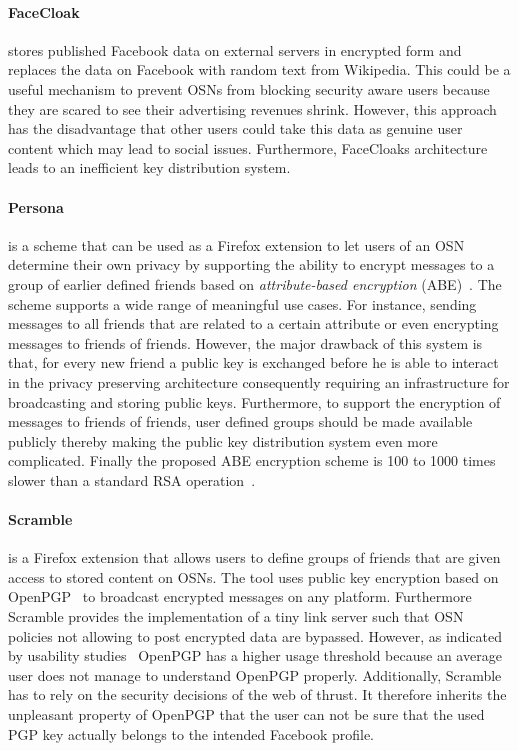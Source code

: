 \paragraph{FaceCloak~\cite{art:LuoXH09}} stores published Facebook data on external servers in encrypted form and replaces the data on Facebook with random text from Wikipedia. This could be a useful mechanism to prevent OSNs from blocking security aware users because they are scared to see their advertising revenues shrink. However, this approach has the disadvantage that other users could take this data as genuine user content which may lead to social issues. Furthermore, FaceCloaks architecture leads to an inefficient key distribution system.

\paragraph{Persona~\cite{art:BadenBSBS09}} is a scheme that can be used as a Firefox extension to let users of an OSN determine their own privacy by supporting the ability to encrypt messages to a group of earlier defined friends based on \textit{attribute-based encryption} (ABE)~\cite{art:SahaiW04}. The scheme supports a wide range of meaningful use cases. For instance, sending messages to all friends that are related to a certain attribute or even encrypting messages to friends of friends. However, the major drawback of this system is that, for every new friend  a public key is exchanged before he is able to interact in the privacy preserving architecture consequently requiring an infrastructure for broadcasting and storing public keys. Furthermore, to support the encryption of messages to friends of friends, user defined groups should be made available publicly thereby making the public key distribution system even more complicated. Finally the proposed ABE encryption scheme is 100 to 1000 times slower than a standard RSA operation~\cite{art:BadenBSBS09}.

\paragraph{Scramble~\cite{art:BeatoKW11}} is a Firefox extension that allows users to define groups of friends that are given access to stored content on OSNs. The tool uses public key encryption based on OpenPGP~\cite{rfc4880} to broadcast encrypted messages on any platform. Furthermore Scramble provides the implementation of a tiny link server such that OSN policies not allowing to post encrypted data are bypassed. However, as indicated by usability studies~\cite{art:WhittenT99} OpenPGP has a higher usage threshold because an average user does not manage to understand OpenPGP properly. Additionally, Scramble has to rely on the security decisions of the web of thrust. It therefore inherits the unpleasant property of OpenPGP that the user can not be sure that the used PGP key actually belongs to the intended Facebook profile.

